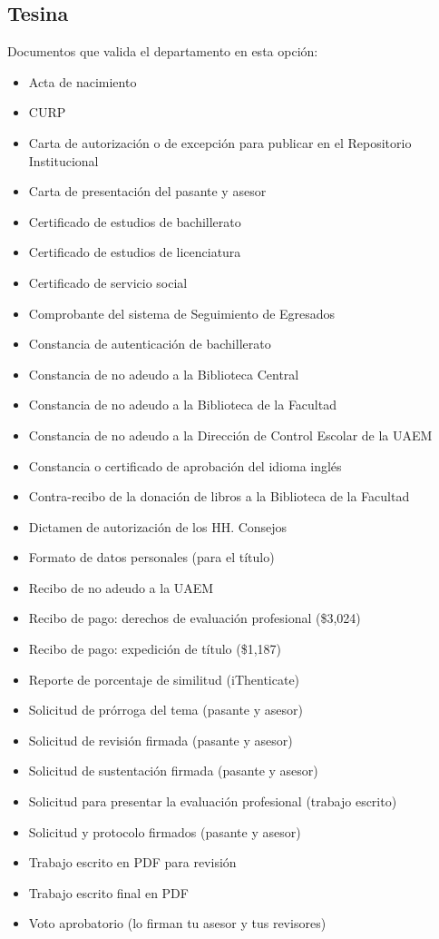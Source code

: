 \subsection{Tesina}
Documentos que valida el departamento en esta opción:
\begin{itemize}
  \item Acta de nacimiento
  \item CURP
  \item Carta de autorización o de excepción para publicar en el Repositorio Institucional
  \item Carta de presentación del pasante y asesor
  \item Certificado de estudios de bachillerato
  \item Certificado de estudios de licenciatura
  \item Certificado de servicio social
  \item Comprobante del sistema de Seguimiento de Egresados
  \item Constancia de autenticación de bachillerato
  \item Constancia de no adeudo a la Biblioteca Central
  \item Constancia de no adeudo a la Biblioteca de la Facultad
  \item Constancia de no adeudo a la Dirección de Control Escolar de la UAEM
  \item Constancia o certificado de aprobación del idioma inglés
  \item Contra-recibo de la donación de libros a la Biblioteca de la Facultad
  \item Dictamen de autorización de los HH. Consejos
  \item Formato de datos personales (para el título)
  \item Recibo de no adeudo a la UAEM
  \item Recibo de pago: derechos de evaluación profesional (\$3,024)
  \item Recibo de pago: expedición de título (\$1,187)
  \item Reporte de porcentaje de similitud (iThenticate)
  \item Solicitud de prórroga del tema (pasante y asesor)
  \item Solicitud de revisión firmada (pasante y asesor)
  \item Solicitud de sustentación firmada (pasante y asesor)
  \item Solicitud para presentar la evaluación profesional (trabajo escrito)
  \item Solicitud y protocolo firmados (pasante y asesor)
  \item Trabajo escrito en PDF para revisión
  \item Trabajo escrito final en PDF
  \item Voto aprobatorio (lo firman tu asesor y tus revisores)
\end{itemize}
